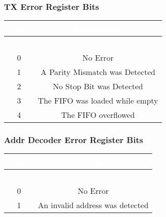 \subsubsection{TX Error Register Bits}
\renewcommand*{\arraystretch}{1.25}
\begingroup
\small
{}
\begin{longtable}{|c|c|}
    \hline
    \rowcolor{gray}
    \textcolor{white}{Value} & \textcolor{white}{Description}  \\ \hline
    \endfirsthead

    \hline
    \rowcolor{gray}
    \textcolor{white}{Value} & \textcolor{white}{Description}  \\ \hline
    \endhead

    \hline
    \endfoot

    0 & No Error \\ \hline
    1 & A Parity Mismatch was Detected \\ \hline
    2 & No Stop Bit was Detected \\ \hline
    3 & The FIFO was loaded while empty \\ \hline
    4 & The FIFO overflowed \\ \hline
\end{longtable}
\label{table:uart_tx_error}
\endgroup

\subsubsection{Addr Decoder Error Register Bits}
\renewcommand*{\arraystretch}{1.25}
\begingroup
\small
{}
\begin{longtable}{|c|c|}
    \hline
    \rowcolor{gray}
    \textcolor{white}{Value} & \textcolor{white}{Description}  \\ \hline
    \endfirsthead

    \hline
    \rowcolor{gray}
    \textcolor{white}{Value} & \textcolor{white}{Description}  \\ \hline
    \endhead

    \hline
    \endfoot

    0 & No Error \\ \hline
    1 & An invalid address was detected \\ \hline
\end{longtable}
\label{table:uart_addrdecode_error}
\endgroup

